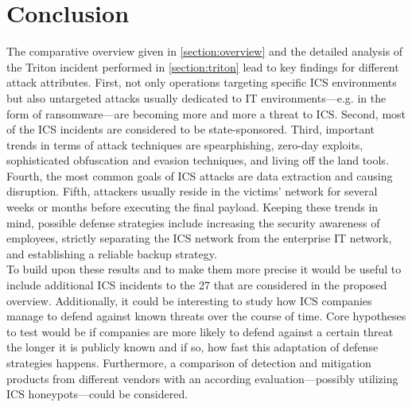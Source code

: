 \documentclass[runningheads]{llncs}
\begin{document}
\section{Conclusion}
\label{section:conclusion}
The comparative overview given in \autoref{section:overview} and the detailed analysis of the Triton incident performed in \autoref{section:triton} lead to key findings for different attack attributes.
First, not only operations targeting specific ICS environments but also untargeted attacks usually dedicated to IT environments---e.g. in the form of ransomware---are becoming more and more a threat to ICS.
Second, most of the ICS incidents are considered to be state-sponsored.
Third, important trends in terms of attack techniques are spearphishing, zero-day exploits, sophisticated obfuscation and evasion techniques, and living off the land tools.
Fourth, the most common goals of ICS attacks are data extraction and causing disruption.
Fifth, attackers usually reside in the victims' network for several weeks or months before executing the final payload.
Keeping these trends in mind, possible defense strategies include increasing the security awareness of employees, strictly separating the ICS network from the enterprise IT network, and establishing a reliable backup strategy. \\
To build upon these results and to make them more precise it would be useful to include additional ICS incidents to the 27 that are considered in the proposed overview.
Additionally, it could be interesting to study how ICS companies manage to defend against known threats over the course of time.
Core hypotheses to test would be if companies are more likely to defend against a certain threat the longer it is publicly known and if so, how fast this adaptation of defense strategies happens.
Furthermore, a comparison of detection and mitigation products from different vendors with an according evaluation---possibly utilizing ICS honeypots---could be considered.


\newpage
%
%
%


\end{document}
